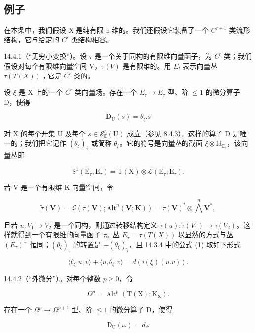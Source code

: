 \subsection{例子}

在本条中，我们假设 X 是纯有限 n 维的。我们还假设它装备了一个 \(C^{r+1}\) 类流形结构，它与给定的 \(C^{r}\) 类结构相容。

14.4.1（“无穷小变换”）。设 \(\tau\) 是一个关于同构的有限维向量函子，为 \(C^r\) 类；我们假设对每个有限维向量空间 V，\(\tau(V)\) 是有限维的。用 \(E_t\) 表示向量丛 \(\tau(T(X))\)；它是 \(C^r\) 类的。

设 \(\xi\) 是 X 上的一个 \(C^r\) 类向量场。存在一个 \(E_{\tau} \to E_{\tau}\) 型、阶 \(\leqslant1\) 的微分算子 D，使得

\[
\mathbf {D} _ {\mathrm{U}} (s) = \theta_ {\xi}. s
\]

对 X 的每个开集 U 及每个 \(s \in \mathcal{S}_{\mathbb{E}}^{r}(\mathrm{U})\) 成立（参见 8.4.3）。这样的算子 D 是唯一的；我们把它记作 \((\theta_{\xi})_{\tau}\) 或简称 \(\theta_{\xi}\)。它的符号是向量丛的截面 \(\xi \otimes \mathrm{Id}_{\mathbb{E}_{\tau}}\)，该向量丛即

\[
\mathrm{S} ^ {1} (\mathrm{E} _ {\tau}, \mathrm{E} _ {\tau}) = \mathrm{T} (\mathrm{X}) \otimes \mathscr {L} (\mathrm{E} _ {\tau}; \mathrm{E} _ {\tau}).
\]

若 V 是一个有限维 K-向量空间，令

\[
\tilde {\tau} (\mathbf {V}) = \mathscr {L} (\tau (\mathbf {V}); \mathrm{Alt} ^ {n} (\mathbf {V}; \mathbf {K})) = \tau (\mathbf {V}) ^ {*} \otimes \bigwedge^ {n} \mathbf {V} ^ {*},
\]

且若 \(u\colon V_{1}\to V_{2}\) 是一个同构，则通过转移结构定义 \(\tilde{\tau}(u)\colon\tilde{\tau}(V_{1})\to\tilde{\tau}(V_{2})\)。这样就得到一个有限维的向量函子 \(\tilde{\tau}\)。丛 \(E_{\tilde{\tau}}=\tilde{\tau}(T(X))\) 以显然的方式与丛 \((E_{\tau})^{\sim}\) 恒同；\((\theta_{\xi})_{\tau}\) 的转置是 \(-( \theta_{\xi})_{\tilde{\tau}}\)，且 14.3.4 中的公式 (1) 取如下形式

\[
\langle \theta_ {\xi}. u, v \rangle + \langle u, \theta_ {\xi}. v \rangle = d (i (\xi) (u. v)).
\]

14.4.2（“外微分”）。对每个整数 \(p \geqslant 0\)，令

\[
\Omega^ {p} = \operatorname{Alt} ^ {p} (\mathrm{T} (\mathrm{X}); \mathrm{K} _ {\mathrm{X}}).
\]

存在一个 \(\Omega^{p} \to \Omega^{p+1}\) 型、阶 \(\leqslant 1\) 的微分算子 D，使得

\[
\mathrm{D} _ {\mathrm{U}} (\omega) = d \omega
\]

